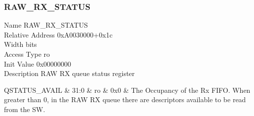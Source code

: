 \documentclass[10pt,a4paper]{paper}
\begin{document}
\subsubsection{RAW\_RX\_STATUS} \label{reg:raw_rx_status}
\begin{regdescription}
	Name			\> RAW\_RX\_STATUS\\
	Relative Address	\> 0xA0030000+0x1c\\
	Width			 bits\\
	Access Type		\> ro\\
	Init Value		\> 0x00000000\\
	Description		\> RAW RX queue status register\\
\end{regdescription}
\begin{regdetails}
	\hline QSTATUS\_AVAIL & 31:0 & ro & 0x0 & The Occupancy of the Rx FIFO.
	When greater than 0, in the RAW RX queue there are descriptors available
	to be read from the SW.\\
\end{regdetails}
\end{document}
